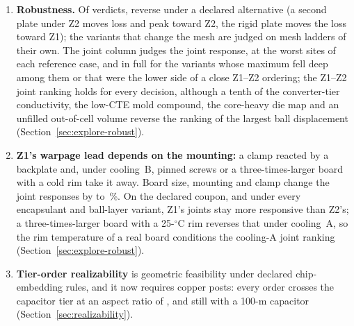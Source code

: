 \documentclass[10pt]{article}
\newcommand{\cl}[1]{\textbf{#1}\enspace}
\begin{document}
\begin{enumerate}
stress and none is benchmarked against a measured joint (Section~\ref{sec:local}).
\item \cl{Robustness.} Of \WrRobN{} verdicts, \WrRobReversedWord{} reverse under a declared alternative
(a second plate under Z2 moves loss and peak toward Z2, the rigid plate moves the loss toward Z1);
the variants that change the mesh are judged on mesh ladders of their own. The joint column judges the joint response, at
the \MvScrK{} worst sites of each reference case, and in full for the \MvScrEscN{} variants whose
maximum fell deep among them or that were the lower side of a close Z1--Z2 ordering; the
Z1--Z2 joint ranking holds for every decision, although a tenth of the converter-tier conductivity, the low-CTE mold compound, the
core-heavy die map and an unfilled out-of-cell volume reverse the ranking of the largest ball displacement
(Section~\ref{sec:explore-robust}).
\item \cl{Z1's warpage lead depends on the mounting:} a clamp reacted by a backplate and, under
cooling~B, pinned screws or a three-times-larger board with a cold rim take it away. Board size,
mounting and clamp change the joint responses by \MvScrBdEpsLo{} to \MvScrBdEpsHi\,\%. On the
declared coupon, and under every encapsulant and ball-layer variant, Z1's joints stay more responsive
than Z2's; a three-times-larger board with a 25-$^\circ$C rim reverses that under cooling~A, so the
rim temperature of a real board conditions the cooling-A joint ranking
(Section~\ref{sec:explore-robust}).
\item \cl{Tier-order realizability} is geometric feasibility under declared chip-embedding rules,
and it now requires copper posts: every order crosses the capacitor tier at an aspect ratio of
\MthWorstAR, and still \MthThinAR{} with a 100-\textmu m capacitor (Section~\ref{sec:realizability}).
\end{enumerate}
\end{document}
